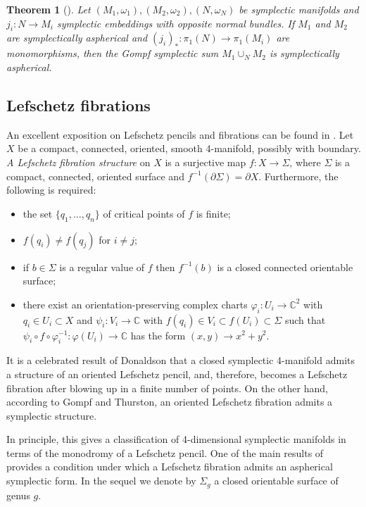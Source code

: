 \documentclass[12pt]{amsart}
\newtheorem{theorem}[subsection]{Theorem}%
\numberwithin{equation}{section}
\theoremstyle{definition}
\theoremstyle{remark}
\numberwithin{figure}{section}
\numberwithin{table}{section}
\newcommand{\om}{{\omega}}
\begin{document}
\begin{theorem}[{\cite[Theorem 6.3]{IKRT}}] 
\label{T:surgery} 
Let $(M_1,\om_1),(M_2,\om_2),(N,\om_N)$ be  
symplectic manifolds and $j_i:N\to M_i$ symplectic  
embeddings with opposite normal bundles.  
If $M_1$ and $M_2$ are symplectically aspherical 
and $(j_i)_*:\pi_1(N)\to \pi_1(M_i)$ are monomorphisms, 
then the Gompf symplectic sum 
$M_1\cup_N M_2$ is symplectically 
aspherical. 
\end{theorem} 
 
\subsection{Lefschetz fibrations}\label{SS:lefschetz} 
An excellent exposition on 
Lefschetz pencils and fibrations can be found in 
\cite{GS}.   
Let $X$ be a compact, connected, oriented, smooth 4-manifold, possibly with 
boundary. {\it A Lefschetz fibration structure} on $X$ is a surjective map $f: 
X\rightarrow \Sigma$, where $\Sigma$ is a compact, connected, oriented surface 
and $f^{-1}(\partial\Sigma)=\partial X$. Furthermore, the following is required:  
\begin{itemize}  
\item the set $\{q_1,...,q_n\}$ of critical points of $f$ is finite;  
\item $f(q_i)\not=f(q_j)$ for $i\not=j$;  
\item if $b\in\Sigma$ is a regular value of $f$ then $f^{-1}(b)$ is a closed 
connected orientable surface;  
\item there exist an orientation-preserving complex charts $\varphi_i: 
U_i\rightarrow \mathbb{C}^2$ with   
$q_i\in U_i\subset X$ and $\psi_i: V_i\rightarrow \mathbb{C}$ with $f(q_i)\in 
V_i\subset f(U_i)\subset \Sigma$ such that   
$\psi_i\circ f\circ\varphi^{-1}_i:\varphi(U_i)\rightarrow\mathbb{C}$ has the 
form $(x,y)\rightarrow x^2+y^2$.  
\end{itemize}   
It is a celebrated result of Donaldson \cite{D1} that 
a closed symplectic 4-manifold admits a structure of 
an oriented Lefschetz pencil, and, therefore, becomes a Lefschetz fibration 
after blowing up in a finite number of points. On the other hand,  
according to Gompf and Thurston, an oriented Lefschetz  
fibration admits a symplectic structure. 
 
In principle, this gives a classification of 4-dimensional 
symplectic manifolds in terms of the monodromy of 
a Lefschetz pencil. One of the main results of \cite{KRT} 
provides a condition under which a Lefschetz fibration 
admits an aspherical symplectic form. In the sequel we denote by $\Sigma_g$ a 
closed orientable surface of genus $g$. 
 
\end{document}
